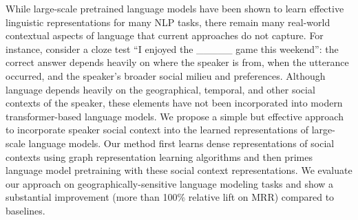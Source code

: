While large-scale pretrained language models have been shown to learn effective linguistic representations for many NLP tasks, there remain many real-world contextual aspects of language that current approaches do not capture. For instance, consider a cloze test ``I enjoyed the \_\_\_\_\_ game this weekend'': the correct answer depends heavily on where the speaker is from, when the utterance occurred, and the speaker's broader social milieu and preferences. Although language depends heavily on the geographical, temporal, and other social contexts of the speaker, these elements have not been incorporated into modern transformer-based language models. We propose a simple but effective approach to incorporate speaker social context into the learned representations of large-scale language models. Our method first learns dense representations of social contexts using graph representation learning algorithms and then primes language model pretraining with these social context representations. We evaluate our approach on geographically-sensitive language modeling tasks and show a substantial improvement (more than 100\% relative lift on MRR) compared to baselines.
